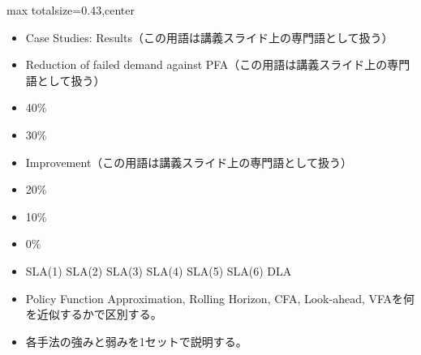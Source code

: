 \clearpage
{}
\begin{minipage}[t]{0.405\textwidth}
\begin{adjustbox}{max totalsize={\textwidth}{0.43\textheight},center}
\begin{minipage}{\textwidth}\scriptsize
{}\begin{itemize}
\item Case Studies: Results（この用語は講義スライド上の専門語として扱う）
\item Reduction of failed demand against PFA（この用語は講義スライド上の専門語として扱う）
\item 40\%
\item 30\%
\item Improvement（この用語は講義スライド上の専門語として扱う）
\item 20\%
\item 10\%
\item 0\%
\item SLA(1) SLA(2) SLA(3) SLA(4) SLA(5) SLA(6) DLA
\end{itemize}\begin{itemize}
\item Policy Function Approximation, Rolling Horizon, CFA, Look-ahead, VFAを何を近似するかで区別する。
\item 各手法の強みと弱みを1セットで説明する。
\end{itemize}
\end{minipage}
\end{adjustbox}
\end{minipage}\hfill
